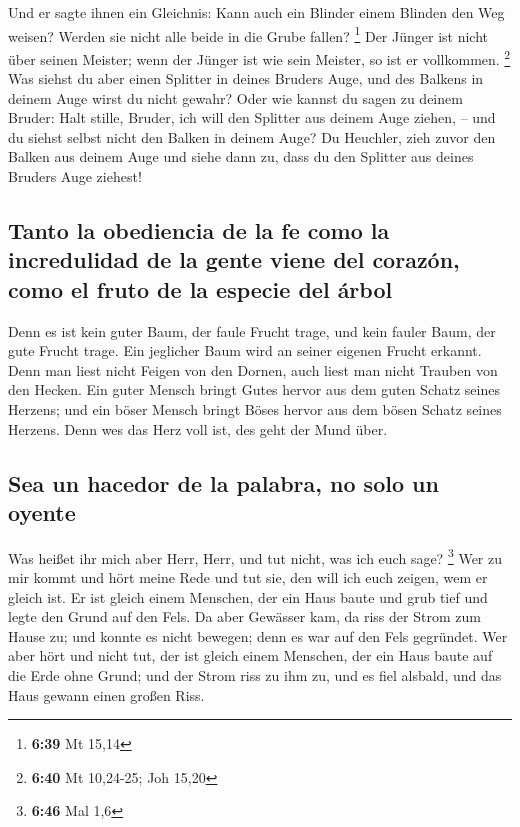  Und er sagte ihnen ein Gleichnis: Kann auch ein Blinder
einem Blinden den Weg weisen? Werden sie nicht alle beide in die Grube
fallen? \footnote{\textbf{6:39} Mt 15,14}  Der Jünger ist
nicht über seinen Meister; wenn der Jünger ist wie sein Meister, so ist
er vollkommen. \footnote{\textbf{6:40} Mt 10,24-25; Joh 15,20}
 Was siehst du aber einen Splitter in deines Bruders
Auge, und des Balkens in deinem Auge wirst du nicht gewahr?
 Oder wie kannst du sagen zu deinem Bruder: Halt stille,
Bruder, ich will den Splitter aus deinem Auge ziehen, -- und du siehst
selbst nicht den Balken in deinem Auge? Du Heuchler, zieh zuvor den
Balken aus deinem Auge und siehe dann zu, dass du den Splitter aus
deines Bruders Auge ziehest!

\hypertarget{tanto-la-obediencia-de-la-fe-como-la-incredulidad-de-la-gente-viene-del-corazuxf3n-como-el-fruto-de-la-especie-del-uxe1rbol}{%
\subsection{Tanto la obediencia de la fe como la incredulidad de la
gente viene del corazón, como el fruto de la especie del
árbol}\label{tanto-la-obediencia-de-la-fe-como-la-incredulidad-de-la-gente-viene-del-corazuxf3n-como-el-fruto-de-la-especie-del-uxe1rbol}}

 Denn es ist kein guter Baum, der faule Frucht trage, und
kein fauler Baum, der gute Frucht trage.  Ein jeglicher
Baum wird an seiner eigenen Frucht erkannt. Denn man liest nicht Feigen
von den Dornen, auch liest man nicht Trauben von den Hecken.
 Ein guter Mensch bringt Gutes hervor aus dem guten
Schatz seines Herzens; und ein böser Mensch bringt Böses hervor aus dem
bösen Schatz seines Herzens. Denn wes das Herz voll ist, des geht der
Mund über.

\hypertarget{sea-un-hacedor-de-la-palabra-no-solo-un-oyente}{%
\subsection{Sea un hacedor de la palabra, no solo un
oyente}\label{sea-un-hacedor-de-la-palabra-no-solo-un-oyente}}

 Was heißet ihr mich aber Herr, Herr, und tut nicht, was
ich euch sage? \footnote{\textbf{6:46} Mal 1,6}  Wer zu
mir kommt und hört meine Rede und tut sie, den will ich euch zeigen, wem
er gleich ist.  Er ist gleich einem Menschen, der ein
Haus baute und grub tief und legte den Grund auf den Fels. Da aber
Gewässer kam, da riss der Strom zum Hause zu; und konnte es nicht
bewegen; denn es war auf den Fels gegründet.  Wer aber
hört und nicht tut, der ist gleich einem Menschen, der ein Haus baute
auf die Erde ohne Grund; und der Strom riss zu ihm zu, und es fiel
alsbald, und das Haus gewann einen großen Riss.

